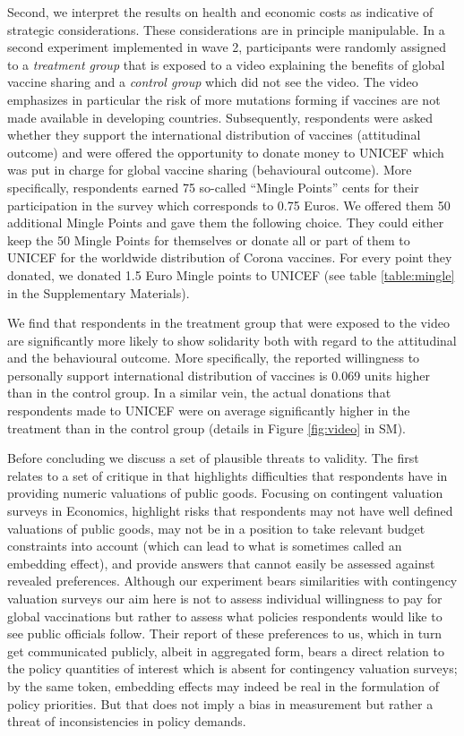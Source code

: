 \documentclass[]{article}
\begin{document}
Second, we interpret the results on health and economic costs as indicative of strategic considerations. These considerations are in principle manipulable. In  a second experiment implemented in wave 2, participants were randomly assigned to a \emph{treatment group} that is exposed to a video explaining the benefits of global vaccine sharing and a \emph{control group} which did not see the video. The video emphasizes in particular the risk of more mutations forming if vaccines are not made available in developing countries. Subsequently, respondents were asked whether they support the international distribution of vaccines (attitudinal outcome) and were offered the opportunity to donate money to UNICEF which was put in charge for global vaccine sharing (behavioural outcome). More specifically, respondents earned 75 so-called ``Mingle Points'' cents for their participation in the survey which corresponds to 0.75 Euros. We offered them  50 additional Mingle Points and gave them the following choice. They could either keep the 50 Mingle Points for themselves  or donate all or part of them to UNICEF for the worldwide distribution of Corona vaccines. For every point they donated, we donated 1.5 Euro Mingle points to UNICEF (see table \ref{table:mingle} in the Supplementary Materials). 



We find that respondents in the treatment group that were exposed to the video are significantly more likely to show solidarity both with regard to the attitudinal and the behavioural outcome. More specifically, the reported willingness to personally support international distribution of vaccines is 0.069 units higher than in the control group. In a similar vein, the actual donations that respondents made to UNICEF were on average significantly higher in the treatment than in the control group (details in Figure \ref{fig:video} in SM). 



Before concluding we discuss a set of plausible threats to validity.  The first relates to a set of critique in \citep{diamond1994contingent} that highlights difficulties that respondents have in providing numeric valuations of public goods. Focusing on contingent valuation surveys in Economics, \citep{diamond1994contingent}  highlight risks that respondents may not have well defined valuations of public goods, may not be in a position to take relevant budget constraints into account (which can lead to what is sometimes called an embedding effect), and provide answers that cannot easily be assessed against revealed preferences. Although our experiment bears similarities with contingency valuation surveys our aim here is not to assess individual willingness to pay for global vaccinations but rather to assess what policies respondents would like to see public officials follow. Their report of these preferences to us, which in turn get communicated publicly, albeit in aggregated form, bears a direct relation to the policy quantities of interest which is absent for contingency valuation surveys; by the same token, embedding effects may indeed be real in the formulation of policy priorities. But that does not imply a bias in measurement but rather a threat of inconsistencies in policy demands.  
\end{document}
